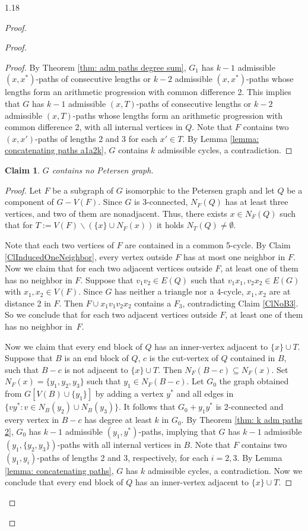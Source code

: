 \documentclass[10pt]{article}
\newtheorem{subclaim}{Claim}[claim]
\begin{document}
\begin{spacing}{1.18}
\begin{proof}
\begin{proof}
\begin{proof}
        By Theorem \ref{thm: adm paths degree sum}, $G_1$ has $k-1$ admissible $(x,x^*)$-paths of consecutive lengths or $k-2$ admissible $(x,x^*)$-paths whose lengths form an arithmetic progression with common difference 2. This implies that $G$ has $k-1$ admissible $(x,T)$-paths of consecutive lengths or $k-2$ admissible $(x,T)$-paths whose lengths form an arithmetic progression with common difference 2, with all internal vertices in $Q$. Note that $F$ contains two $(x,x')$-paths of lengths 2 and 3 for each $x'\in T$. By Lemma \ref{lemma: concatenating paths a1a2k}, $G$ contains $k$ admissible cycles, a contradiction.
    \end{proof}
    
    \begin{subclaim}\label{ClNoPetersen}
        $G$ contains no Petersen graph.
    \end{subclaim}

    \begin{proof}
        Let $F$ be a subgraph of $G$ isomorphic to the Petersen graph and let $Q$ be a component of $G-V(F)$. Since $G$ is $3$-connected, $N_F(Q)$ has at least three vertices, and two of them are nonadjacent. Thus, there exists $x\in N_F(Q)$ such that for $T:=V(F)\backslash(\{x\}\cup N_F(x))$ it holds $N_T(Q)\neq\emptyset$.

        Note that each two vertices of $F$ are contained in a common 5-cycle. By Claim \ref{ClInducedOneNeighbor}, every vertex outside $F$ has at most one neighbor in $F$. Now we claim that for each two adjacent vertices outside $F$, at least one of them has no neighbor in $F$. Suppose that $v_1v_2\in E(Q)$ such that $v_1x_1,v_2x_2\in E(G)$ with $x_1,x_2\in V(F)$. Since $G$ has neither a triangle nor a 4-cycle, $x_1,x_2$ are at distance 2 in $F$. Then $F\cup x_1v_1v_2x_2$ contains a $F_3$, contradicting Claim \ref{ClNoB3}. So we conclude that for each two adjacent vertices outside $F$, at least one of them has no neighbor in~$F$.

        Now we claim that every end block of $Q$ has an inner-vertex adjacent to $\{x\}\cup T$. Suppose that $B$ is an end block of $Q$, $c$ is the cut-vertex of $Q$ contained in $B$, such that $B-c$ is not adjacent to $\{x\}\cup T$. Then $N_F(B-c)\subseteq N_F(x)$. Set $N_F(x)=\{y_1,y_2,y_3\}$ such that $y_1\in N_F(B-c)$. Let $G_0$ the graph obtained from $G[V(B)\cup\{y_1\}]$ by adding a vertex $y^*$ and all edges in $\{vy^*: v\in N_B(y_2)\cup N_B(y_3)\}$. It follows that $G_0+y_1y^*$ is 2-connected and every vertex in $B-c$ has degree at least $k$ in $G_0$. By Theorem \ref{thm: k adm paths 2}, $G_0$ has $k-1$ admissible $(y_1,y^*)$-paths, implying that $G$ has $k-1$ admissible $(y_1,\{y_2,y_3\})$-paths with all internal vertices in $B$. Note that $F$ contains two $(y_1,y_i)$-paths of lengths 2 and 3, respectively, for each $i=2,3$. By Lemma \ref{lemma: concatenating paths}, $G$ has $k$ admissible cycles, a contradiction. Now we conclude that every end block of $Q$ has an inner-vertex adjacent to $\{x\}\cup T$. 
        

\end{proof}
\end{proof}
\end{proof}
\end{spacing}
\end{document}
